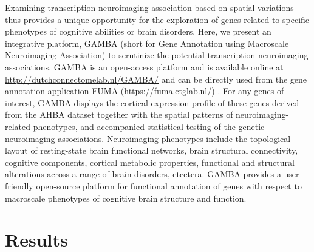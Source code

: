 \begin{refsection}
Examining transcription-neuroimaging association based on spatial variations thus provides a unique opportunity for the exploration of genes related to specific phenotypes of cognitive abilities or brain disorders. Here, we present an integrative platform, GAMBA (short for Gene Annotation using Macroscale Neuroimaging Association) to scrutinize the potential transcription-neuroimaging associations. GAMBA is an open-access platform and is available online at \url{http://dutchconnectomelab.nl/GAMBA/} and can be directly used from the gene annotation application FUMA (\url{https://fuma.ctglab.nl/}) \citep{watanabe2017functional}. For any genes of interest, GAMBA displays the cortical expression profile of these genes derived from the AHBA dataset together with the spatial patterns of neuroimaging-related phenotypes, and accompanied statistical testing of the genetic-neuroimaging associations. Neuroimaging phenotypes include the topological layout of resting-state brain functional networks, brain structural connectivity, cognitive components, cortical metabolic properties, functional and structural alterations across a range of brain disorders, etcetera. GAMBA provides a user-friendly open-source platform for functional annotation of genes with respect to macroscale phenotypes of cognitive brain structure and function.

\section*{Results}

\end{refsection}
